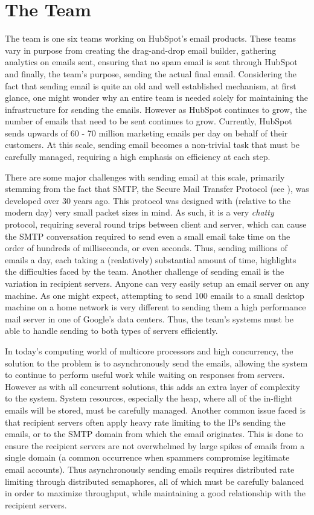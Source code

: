 \section{The \team{} Team} \label{sec:emailSendingInfra}
The \team{} team is one six teams working on HubSpot's email products. These teams vary in purpose from creating the drag-and-drop email builder, gathering analytics on emails sent, ensuring that no spam email is sent through HubSpot and finally, the \team{} team's purpose, sending the actual final email. Considering the fact that sending email is quite an old and well established mechanism, at first glance, one might wonder why an entire team is needed solely for maintaining the infrastructure for sending the emails. However as HubSpot continues to grow, the number of emails that need to be sent continues to grow. Currently, HubSpot sends upwards of 60 - 70 million marketing emails per day on behalf of their customers. At this scale, sending email becomes a non-trivial task that must be carefully managed, requiring a high emphasis on efficiency at each step. 

There are some major challenges with sending email at this scale, primarily stemming from the fact that SMTP, the Secure Mail Transfer Protocol (see ), was developed over 30 years ago. This protocol was designed with (relative to the modern day) very small packet sizes in mind. As such, it is a very \textit{chatty} protocol, requiring several round trips between client and server, which can cause the SMTP conversation required to send even a small email take time on the order of hundreds of milliseconds, or even seconds. Thus, sending millions of emails a day, each taking a (realatively) substantial amount of time, highlights the difficulties faced by the \team{} team. Another challenge of sending email is the variation in recipient servers. Anyone can very easily setup an email server on any machine. As one might expect, attempting to send 100 emails to a small desktop machine on a home network is very different to sending them a high performance mail server in one of Google's data centers. Thus, the \team{} team's systems must be able to handle sending to both types of servers efficiently. 

In today's computing world of multicore processors and high concurrency, the solution to the problem is to asynchronously send the emails, allowing the system to continue to perform useful work while waiting on responses from servers. However as with all concurrent solutions, this adds an extra layer of complexity to the system. System resources, especially the heap, where all of the in-flight emails will be stored, must be carefully managed. Another common issue faced is that recipient servers often apply heavy rate limiting to the IPs sending the emails, or to the SMTP domain from which the email originates. This is done to ensure the recipient servers are not overwhelmed by large spikes of emails from a single domain (a common occurrence when spammers compromise legitimate email accounts). Thus asynchronously sending emails requires distributed rate limiting through distributed semaphores, all of which must be carefully balanced in order to maximize throughput, while maintaining a good relationship with the recipient servers. 

